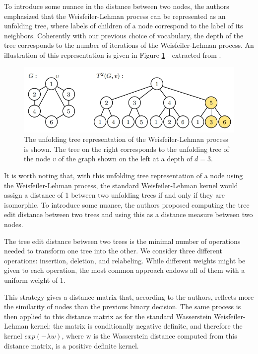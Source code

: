 \documentclass{IEEEtran}
\begin{document}
To introduce some nuance in the distance between two nodes, the authors emphasized that the Weisfeiler-Lehman process can be represented as an unfolding tree, where labels of children of a node correspond to the label of its neighbors. Coherently with our previous choice of vocabulary, the depth of the tree corresponds to the number of iterations of the Weisfeiler-Lehman process.
An illustration of this representation is given in Figure \ref{fig:unfolding} - extracted from \cite{schulz2022generalized}.

\begin{figure}[h]
    \centering
    \includegraphics[width=\linewidth]{wwl_unfolding_trees.jpg}
    \caption{The unfolding tree representation of the Weisfeiler-Lehman process is shown. The tree on the right corresponds to the unfolding tree of the node $v$ of the graph shown on the left at a depth of $d=3$.}
    \label{fig:unfolding}
\end{figure}


It is worth noting that, with this unfolding tree representation of a node using the Weisfeiler-Lehman process, the standard Weisfeiler-Lehman kernel would assign a distance of 1 between two unfolding trees if and only if they are isomorphic. To introduce some nuance, the authors proposed computing the tree edit distance between two trees and using this as a distance measure between two nodes.

The tree edit distance between two trees is the minimal number of operations needed to transform one tree into the other. We consider three different operations: insertion, deletion, and relabeling. While different weights might be given to each operation, the most common approach endows all of them with a uniform weight of 1.

This strategy gives a distance matrix that, according to the authors, reflects more the similarity of nodes than the previous binary decision. The same process is then applied to this distance matrix as for the standard Wasserstein Weisfeiler-Lehman kernel: the matrix is conditionally negative definite, and therefore the kernel $exp(- \lambda w)$,
where w is the Wasserstein distance computed from this distance matrix, is a positive definite kernel.
\end{document}
